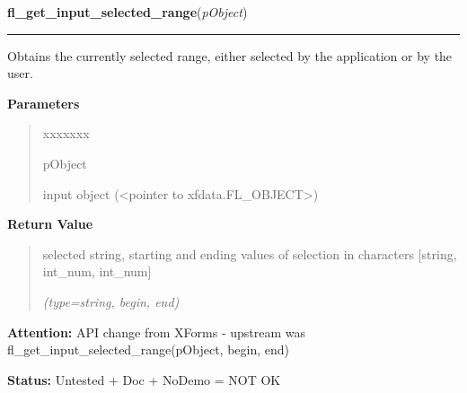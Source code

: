 \hspace{.8\funcindent}\begin{boxedminipage}{\funcwidth}

    \raggedright \textbf{fl\_get\_input\_selected\_range}(\textit{pObject})

    \vspace{-1.5ex}

    \rule{\textwidth}{0.5\fboxrule}
\setlength{\parskip}{2ex}
    Obtains the currently selected range, either selected by the 
    application or by the user.

\setlength{\parskip}{1ex}
      \textbf{Parameters}
      \vspace{-1ex}

      \begin{quote}
        \begin{Ventry}{xxxxxxx}

          \item[pObject]

          input object ({\textless}pointer to 
          xfdata.FL\_OBJECT{\textgreater})

        \end{Ventry}

      \end{quote}

      \textbf{Return Value}
    \vspace{-1ex}

      \begin{quote}
      selected string, starting and ending values of selection in 
      characters [string, int\_num, int\_num]

      {\it (type=string, begin, end)}

      \end{quote}

\textbf{Attention:} API change from XForms - upstream was 
fl\_get\_input\_selected\_range(pObject, begin, end)



\textbf{Status:} Untested + Doc + NoDemo = NOT OK



    \end{boxedminipage}

    \label{xformslib:library:fl_set_input_maxchars}

    \vspace{0.5ex}

